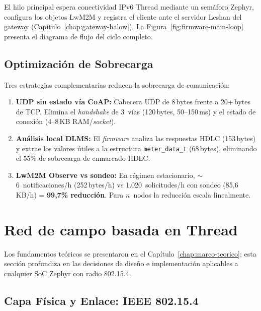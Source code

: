 El hilo principal espera conectividad IPv6 Thread mediante un semáforo Zephyr, configura los objetos LwM2M y registra el cliente ante el servidor Leshan del gateway (Capítulo~\ref{chap:gateway-halow}).  La Figura~\ref{fig:firmware-main-loop} presenta el diagrama de flujo del ciclo completo.



\subsection{Optimización de Sobrecarga}
\label{sec:nodo-optimizacion-overhead}
\label{sec:nodo-overhead}

Tres estrategias complementarias reducen la sobrecarga de comunicación:

\begin{enumerate}
    \item \textbf{UDP sin estado vía CoAP:} Cabecera UDP de 8\,bytes frente a 20+\,bytes de TCP. Elimina el \emph{handshake} de 3~vías (120\,bytes, 50--150\,ms) y el estado de conexión (4--8\,KB RAM/\emph{socket}).
    \item \textbf{Análisis local DLMS:} El \emph{firmware} analiza las respuestas HDLC (153\,bytes) y extrae los valores útiles a la estructura \texttt{meter\_data\_t} (68\,bytes), eliminando el 55\% de sobrecarga de enmarcado HDLC.
    \item \textbf{LwM2M Observe vs sondeo:} En régimen estacionario, $\sim$6~notificaciones/h (252\,bytes/h) vs 1.020~solicitudes/h con sondeo (85,6\,KB/h) = \textbf{99,7\% reducción}. Para $n$~nodos la reducción escala linealmente.
\end{enumerate}


\section{Red de campo basada en Thread}
\label{sec:nodo-pila-protocolos}

Los fundamentos teóricos se presentaron en el Capítulo~\ref{chap:marco-teorico}; esta sección profundiza en las decisiones de diseño e implementación aplicables a cualquier SoC Zephyr con radio 802.15.4.



\subsection{Capa Física y Enlace: IEEE 802.15.4}
\label{sec:nodo-ieee802154}

